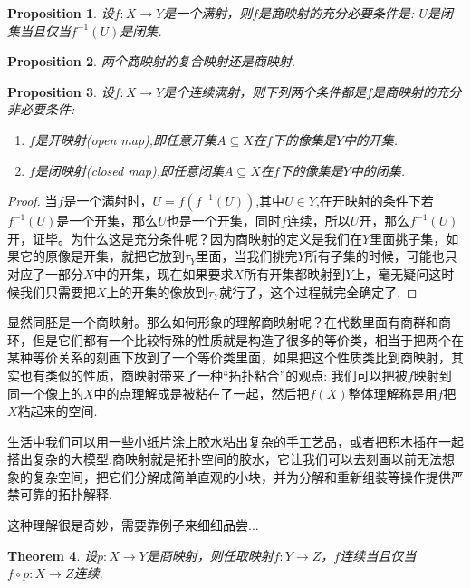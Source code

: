 \documentclass{article}
\newtheorem{theorem}{Theorem}[section]
\newtheorem{proposition}[theorem]{Proposition}
\newcommand*{\xfunc}[4]{{#2}\colon{#3}{#1}{#4}}
\newcommand*{\func}[3]{\xfunc{\to}{#1}{#2}{#3}}
\begin{document}
\begin{proposition}
设$\func{f}{X}{Y}$是一个满射，则$f$是商映射的充分必要条件是: $U$是闭集当且仅当$f^{-1}(U)$是闭集.
\end{proposition}

\begin{proposition}
两个商映射的复合映射还是商映射.
\end{proposition}

\begin{proposition}
设$\func{f}{X}{Y}$是个连续满射，则下列两个条件都是$f$是商映射的充分非必要条件:
\begin{enumerate}
	\item $f$是开映射(open map),即任意开集$A \subseteq X$在$f$下的像集是$Y$中的开集.
	\item $f$是闭映射(closed map),即任意闭集$A \subseteq X$在$f$下的像集是$Y$中的闭集.
\end{enumerate}
\end{proposition}

\begin{proof}
当$f$是一个满射时，$U=f(f^{-1}(U))$,其中$U \in Y$,在开映射的条件下若$f^{-1}(U)$是一个开集，那么$U$也是一个开集，同时$f$连续，所以$U$开，那么$f^{-1}(U)$开，证毕。为什么这是充分条件呢？因为商映射的定义是我们在$Y$里面挑子集，如果它的原像是开集，就把它放到$\tau_Y$里面，当我们挑完$Y$所有子集的时候，可能也只对应了一部分$X$中的开集，现在如果要求$X$所有开集都映射到$Y$上，毫无疑问这时候我们只需要把$X$上的开集的像放到$\tau_Y$就行了，这个过程就完全确定了.
\end{proof}

显然同胚是一个商映射。那么如何形象的理解商映射呢？在代数里面有商群和商环，但是它们都有一个比较特殊的性质就是构造了很多的等价类，相当于把两个在某种等价关系的刻画下放到了一个等价类里面，如果把这个性质类比到商映射，其实也有类似的性质，商映射带来了一种“拓扑粘合”的观点: 我们可以把被$f$映射到同一个像上的$X$中的点理解成是被粘在了一起，然后把$f(X)$整体理解称是用$f$把$X$粘起来的空间.

生活中我们可以用一些小纸片涂上胶水粘出复杂的手工艺品，或者把积木插在一起搭出复杂的大模型.商映射就是拓扑空间的胶水，它让我们可以去刻画以前无法想象的复杂空间，把它们分解成简单直观的小块，并为分解和重新组装等操作提供严禁可靠的拓扑解释.

这种理解很是奇妙，需要靠例子来细细品尝...

\begin{theorem}
设$\func{p}{X}{Y}$是商映射，则任取映射$\func{f}{Y}{Z}$，$f$连续当且仅当$\func{f \circ p}{X}{Z}$连续.
\end{theorem}
\end{document}
